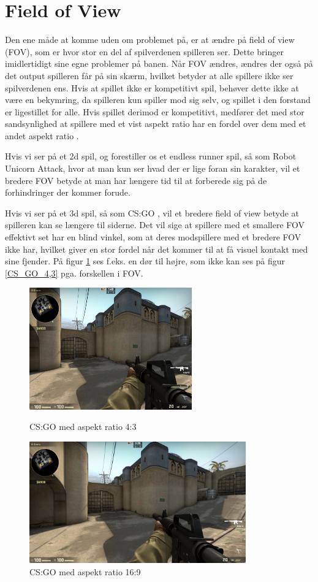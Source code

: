 \documentclass[Main.tex]{AspectRatio.tex}
\begin{document}
\section{Field of View}

Den ene måde at komme uden om problemet på, er at ændre på field of view (FOV), som er hvor stor en del af spilverdenen spilleren ser. Dette bringer imidlertidigt sine egne problemer på banen. Når FOV ændres, ændres der også på det output spilleren får på sin skærm, hvilket betyder at alle spillere ikke ser spilverdenen ens. Hvis at spillet ikke er kompetitivt spil, behøver dette ikke at være en bekymring, da spilleren kun spiller mod sig selv, og spillet i den forstand er ligestillet for alle. Hvis spillet derimod er kompetitivt, medfører det med stor sandsynlighed at spillere med et vist aspekt ratio har en fordel over dem med et andet aspekt ratio \cite{Atwood}.

Hvis vi ser på et 2d spil, og forestiller os et endless runner spil, så som Robot Unicorn Attack\cite{RUAGame}, hvor at man kun ser hvad der er lige foran sin karakter, vil et bredere FOV betyde at man har længere tid til at forberede sig på de forhindringer der kommer forude.

Hvis vi ser på et 3d spil, så som CS:GO \cite{CS:GOGame}, vil et bredere field of view betyde at spilleren kan se længere til siderne. Det vil sige at spillere med et smallere FOV effektivt set har en blind vinkel, som at deres modspillere med et bredere FOV ikke har, hvilket giver en stor fordel når det kommer til at få visuel kontakt med sine fjender. På figur \ref{CS_GO_16,9} ses f.eks. en dør til højre, som ikke kan ses på figur \ref{CS_GO_4,3} pga. forskellen i FOV.
\clearpage


\begin{figure}[h]
\centering
\parbox{7cm}{
\includegraphics[width = 7cm]{billeder/CS_GO_4,3}
\caption{CS:GO med aspekt ratio 4:3}    
\label{CS_GO_4,3}}
\qquad
\begin{minipage}{9.33cm}
\includegraphics[width = 9.33cm]{billeder/CS_GO_16,9}
\caption{CS:GO med aspekt ratio 16:9}    
\label{CS_GO_16,9}
\end{minipage}
\end{figure} 
\end{document}
